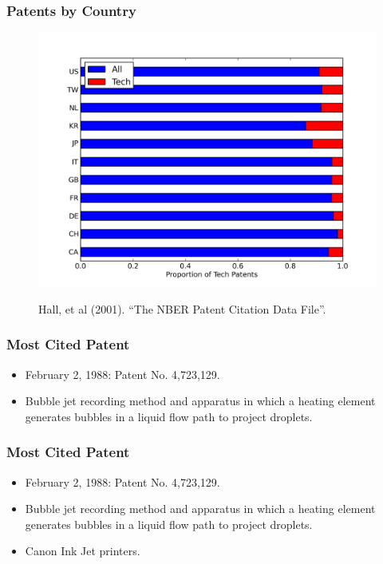 \documentclass{beamer}
\begin{document}
\begin{frame}[t]\frametitle{Patents by Country} 
\fontsize{6pt}{7.2}\selectfont
\!\!\!\!\!\!\!\!\!\!\!\!\!
\begin{figure}[T]
  \begin{center}
    \includegraphics[scale=.5]{by_country_normalized.png}
    \label{fig:by_country_normalized}
  \end{center}
  \!\!\!\!\!
  Hall, et al (2001). ``The NBER Patent Citation Data File''.

\end{figure}
\end{frame}

\begin{frame}[t]\frametitle{Most Cited Patent} 
  \begin{itemize}
	  \vspace{20mm}
    \item<+-> February 2, 1988: Patent No. 4,723,129.
	\vspace{2mm}
    \item<+-> Bubble jet recording method and apparatus in which a heating element generates bubbles in a liquid flow path to project droplets.
  \end{itemize}
\end{frame}


\begin{frame}[t]\frametitle{Most Cited Patent} 
  \begin{itemize}
	  \vspace{20mm}
    \item February 2, 1988: Patent No. 4,723,129.
	\vspace{2mm}
    \item Bubble jet recording method and apparatus in which a heating element generates bubbles in a liquid flow path to project droplets.
	\vspace{.5mm}
    \item Canon Ink Jet printers.
  \end{itemize}
\end{frame}
\end{document}
